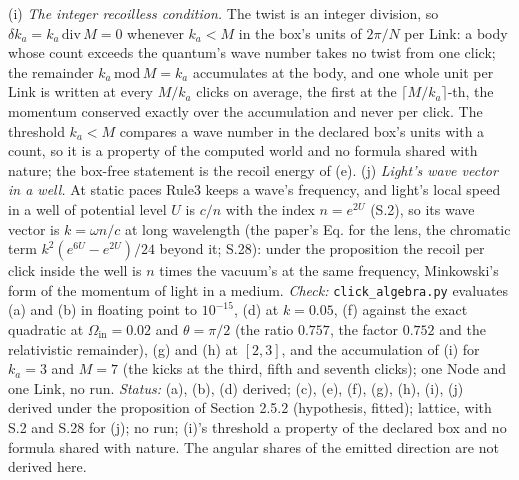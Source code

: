 \begin{derivation}
(i) \emph{The integer recoilless condition.} The twist is an integer division, so $\delta k_a = k_a\,\mathrm{div}\,M = 0$ whenever $k_a < M$ in the box's units of $2\pi / N$ per Link: a body whose count exceeds the quantum's wave number takes no twist from one click; the remainder $k_a\,\mathrm{mod}\,M = k_a$ accumulates at the body, and one whole unit per Link is written at every $M / k_a$ clicks on average, the first at the $\lceil M / k_a\rceil$-th, the momentum conserved exactly over the accumulation and never per click. The threshold $k_a < M$ compares a wave number in the declared box's units with a count, so it is a property of the computed world and no formula shared with nature; the box-free statement is the recoil energy of (e). (j) \emph{Light's wave vector in a well.} At static paces Rule3 keeps a wave's frequency, and light's local speed in a well of potential level $U$ is $c / n$ with the index $n = e^{2U}$ (S.2), so its wave vector is $k = \omega n / c$ at long wavelength (the paper's Eq. for the lens, the chromatic term $k^2(e^{6U} - e^{2U}) / 24$ beyond it; S.28): under the proposition the recoil per click inside the well is $n$ times the vacuum's at the same frequency, Minkowski's form of the momentum of light in a medium.
\emph{Check:} \texttt{click\_algebra.py} evaluates (a) and (b) in floating point to $10^{-15}$, (d) at $k = 0.05$, (f) against the exact quadratic at $\Omega_{\mathrm{in}} = 0.02$ and $\theta = \pi / 2$ (the ratio $0.757$, the factor $0.752$ and the relativistic remainder), (g) and (h) at $[2, 3]$, and the accumulation of (i) for $k_a = 3$ and $M = 7$ (the kicks at the third, fifth and seventh clicks); one Node and one Link, no run.
\emph{Status:} (a), (b), (d) derived; (c), (e), (f), (g), (h), (i), (j) derived under the proposition of Section 2.5.2 (hypothesis, fitted); lattice, with S.2 and S.28 for (j); no run; (i)'s threshold a property of the declared box and no formula shared with nature. The angular shares of the emitted direction are not derived here.
\end{derivation}
